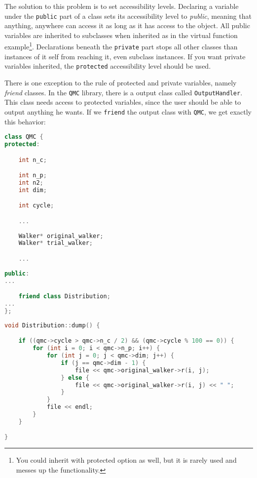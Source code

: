 The solution to this problem is to set accessibility levels. Declaring a variable under the \verb+public+ part of a class sets its accessibility level to \textit{public}, meaning that anything, anywhere can access it as long as it has access to the object. All public variables are inherited to subclasses when inherited as in the virtual function example\footnote{You could inherit with protected option as well, but it is rarely used and messes up the functionality.}. Declarations beneath the \verb+private+ part stops all other classes than instances of it self from reaching it, even subclass instances. If you want private variables inherited, the \verb+protected+ accessibility level should be used.

There is one exception to the rule of protected and private variables, namely \textit{friend} classes. In the \verb+QMC+ library, there is a output class called \verb+OutputHandler+. This class needs access to protected variables, since the user should be able to output anything he wants. If we \verb+friend+ the output class with \verb+QMC+, we get exactly this behavior: 

\vspace{0.5 cm}
\begin{lstlisting}[language=c++]
class QMC {
protected:

    int n_c;

    int n_p;
    int n2;
    int dim;

    int cycle;

    ...
    
    Walker* original_walker;
    Walker* trial_walker;

    ...
    
public:
...

    friend class Distribution;
...
};
\end{lstlisting}

\begin{lstlisting}[language=c++]
void Distribution::dump() {

    if ((qmc->cycle > qmc->n_c / 2) && (qmc->cycle % 100 == 0)) {
        for (int i = 0; i < qmc->n_p; i++) {
            for (int j = 0; j < qmc->dim; j++) {
                if (j == qmc->dim - 1) {
                    file << qmc->original_walker->r(i, j);
                } else {
                    file << qmc->original_walker->r(i, j) << " ";
                }
            }
            file << endl;
        }
    }

}
\end{lstlisting}

